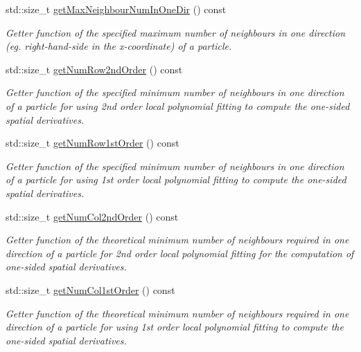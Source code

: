 \begin{DoxyCompactItemize}
std\-::size\-\_\-t \hyperlink{classInitializer_a67b441e77ae377f8f418d6c28afd8df1}{get\-Max\-Neighbour\-Num\-In\-One\-Dir} () const 
\begin{DoxyCompactList}\small\item\em Getter function of the specified maximum number of neighbours in one direction (eg. right-\/hand-\/side in the x-\/coordinate) of a particle. \end{DoxyCompactList}\item 
std\-::size\-\_\-t \hyperlink{classInitializer_a2e286f2e4362dea53eda3c20ab5f7ede}{get\-Num\-Row2nd\-Order} () const 
\begin{DoxyCompactList}\small\item\em Getter function of the specified minimum number of neighbours in one direction of a particle for using 2nd order local polynomial fitting to compute the one-\/sided spatial derivatives. \end{DoxyCompactList}\item 
std\-::size\-\_\-t \hyperlink{classInitializer_a50c331f21050b50e4f4d0dee113ac69d}{get\-Num\-Row1st\-Order} () const 
\begin{DoxyCompactList}\small\item\em Getter function of the specified minimum number of neighbours in one direction of a particle for using 1st order local polynomial fitting to compute the one-\/sided spatial derivatives. \end{DoxyCompactList}\item 
std\-::size\-\_\-t \hyperlink{classInitializer_a6e605410501b5ae0295cc27b80fa76d0}{get\-Num\-Col2nd\-Order} () const 
\begin{DoxyCompactList}\small\item\em Getter function of the theoretical minimum number of neighbours required in one direction of a particle for 2nd order local polynomial fitting for the computation of one-\/sided spatial derivatives. \end{DoxyCompactList}\item 
std\-::size\-\_\-t \hyperlink{classInitializer_af0098f9d59ac38ca48e19759f2c4b6a5}{get\-Num\-Col1st\-Order} () const 
\begin{DoxyCompactList}\small\item\em Getter function of the theoretical minimum number of neighbours required in one direction of a particle for using 1st order local polynomial fitting to compute the one-\/sided spatial derivatives. \end{DoxyCompactList}\item 

\end{DoxyCompactItemize}
